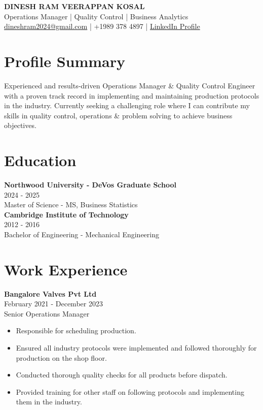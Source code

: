 \documentclass[a4paper,10pt]{article}
\begin{document}
\begin{tcolorbox}[colback=skyblue!20, colframe=skyblue!20]
\begin{center}
    {\LARGE \textbf{DINESH RAM VEERAPPAN KOSAL}} \\
    \vspace{0.2cm}
    Operations Manager | Quality Control | Business Analytics \\
    \vspace{0.2cm}
    \href{mailto:dineshram2024@gmail.com}{dineshram2024@gmail.com} | +1989 378 4897 | \href{www.linkedin.com/in/dinesh-ram-veerappan-kosal-2ab480222}{LinkedIn Profile} \\
\end{center}
\end{tcolorbox}
\pagestyle{empty}

\begin{multicols}{2}
\section*{Profile Summary}
Experienced and results-driven Operations Manager \& Quality Control Engineer with a proven track record in implementing and maintaining production protocols in the industry. Currently seeking a challenging role where I can contribute my skills in quality control, operations \& problem solving to achieve business objectives.

\section*{Education}
\textbf{Northwood University - DeVos Graduate School} \\
2024 - 2025 \\
Master of Science - MS, Business Statistics \\

\noindent
\textbf{Cambridge Institute of Technology} \\
\hfill 2012 - 2016 \\
Bachelor of Engineering - Mechanical Engineering \\

\section*{Work Experience}
\textbf{Bangalore Valves Pvt Ltd} \\
\hfill February 2021 - December 2023 \\
Senior Operations Manager
\begin{itemize}
    \item Responsible for scheduling production.
    \item Ensured all industry protocols were implemented and followed thoroughly for production on the shop floor.
    \item Conducted thorough quality checks for all products before dispatch.
    \item Provided training for other staff on following protocols and implementing them in the industry.
\end{itemize}


\end{multicols}
\end{document}
